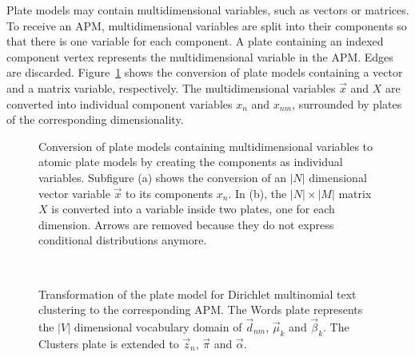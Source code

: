 Plate models may contain multidimensional variables, such as vectors or matrices. To receive an APM, multidimensional variables are split into their components so that there is one variable for each component. A plate containing an indexed component vertex represents the multidimensional variable in the APM. Edges are discarded. Figure~\ref{fig:pm2apm} shows the conversion of plate models containing a vector and a matrix variable, respectively. The multidimensional variables $\vec x$ and $X$ are converted into individual component variables $x_n$ and $x_{nm}$, surrounded by plates of the corresponding dimensionality.

\begin{figure}[p]
\centering
\scalebox{\tikzScale}{\adjustTikzSize }
\caption[Conversion of plate models to atomic plate models]{Conversion of plate models containing multidimensional variables to atomic plate models by creating the components as individual variables. Subfigure (a) shows the conversion of an $|N|$ dimensional vector variable $\vec x$ to its components $x_n$. In (b), the $|N| \times |M|$ matrix $X$ is converted into a variable inside two plates, one for each dimension. Arrows are removed because they do not express conditional distributions anymore.}\label{fig:pm2apm}
\end{figure}

\begin{figure}[p]
\begin{minipage}[t]{0.49\linewidth}
	\begin{center}
	\end{center}
\end{minipage}
\hspace{0.0cm}
\begin{minipage}[t]{0.49\linewidth}
	\begin{center}
	\end{center}
\end{minipage}\\
\caption[Dirichlet multinomial text clustering APM]{Transformation of the plate model for Dirichlet multinomial text clustering to the corresponding APM. The Words plate represents the $|V|$ dimensional vocabulary domain of $\vec d_{nm}$, $\vec \mu_k$ and $\vec \beta_k$. The Clusters plate is extended to $\vec z_n$, $\vec \pi$ and $\vec \alpha$.}
\label{fig:clustering_platemodels}
\end{figure}

